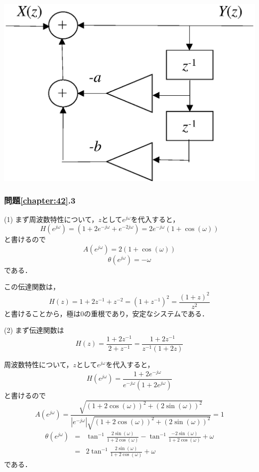 \begin{center}
\includegraphics[width=.5\textwidth]{fig/zu-9e-1c.eps}
\end{center}

\subsubsection*{問題\ref{chapter:42}.3}

\noindent (1) まず周波数特性について，$z$として$e^{j\omega }$を代入すると，
\begin{displaymath}
H(e^{j\omega }) = (1+2e^{-j\omega }+e^{-2j\omega }) = 2e^{-j\omega}(1+\cos(\omega)) \nonumber
\end{displaymath}
と書けるので
\begin{displaymath}
A(e^{j\omega }) = 2(1+\cos(\omega)) \nonumber
\end{displaymath}
\begin{displaymath}
\theta(e^{j\omega }) = -\omega \nonumber
\end{displaymath}
である．

この伝達関数は，
\begin{displaymath}
H(z)=1+2z^{-1}+z^{-2}=(1+z^{-1})^2=\frac{(1+z)^2}{z^2} \nonumber
\end{displaymath}
と書けることから，極は0の重根であり，安定なシステムである．

\noindent (2) まず伝達関数は
\begin{displaymath}
H(z)=\displaystyle \frac{1+2z^{-1}}{2+z^{-1}}=\displaystyle \frac{1+2z^{-1}}{z^{-1}(1+2z)} \nonumber
\end{displaymath}

周波数特性について，$z$として$e^{j\omega }$を代入すると，
\begin{displaymath}
H(e^{j\omega }) = \displaystyle \frac{1+2e^{-j\omega }}{e^{-j\omega }(1+2e^{j\omega })} \nonumber
\end{displaymath}
と書けるので
\begin{displaymath}
A(e^{j\omega }) = \frac{\sqrt{(1+2\cos(\omega))^2+(2\sin(\omega))^2}}{|e^{-j\omega }|\sqrt{(1+2\cos(\omega))^2+(2\sin(\omega))^2}}=1 \nonumber
\end{displaymath}
\begin{eqnarray}
\theta(e^{j\omega }) &=& \tan^{-1}\frac{2\sin(\omega)}{1+2\cos(\omega)}-\tan^{-1}\frac{-2\sin(\omega)}{1+2\cos(\omega)}+\omega \nonumber \\
&=& 2\tan^{-1}\frac{2\sin(\omega)}{1+2\cos(\omega)}+\omega \nonumber
\end{eqnarray}
である．

